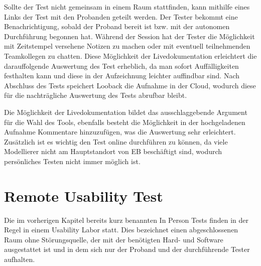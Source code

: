 Sollte der Test nicht gemeinsam in einem Raum stattfinden, kann mithilfe eines Links der Test mit den Probanden geteilt werden.
Der Tester bekommt eine Benachrichtigung, sobald der Proband bereit ist bzw. mit der autonomen Durchführung begonnen hat.
Während der Session hat der Tester die Möglichkeit mit Zeitstempel versehene Notizen zu machen oder mit eventuell teilnehmenden Teamkollegen zu chatten.
Diese Möglichkeit der Livedokumentation erleichtert die darauffolgende Auswertung des Test erheblich, da man sofort Auffälligkeiten festhalten kann und diese in der Aufzeichnung leichter auffindbar sind.
Nach Abschluss des Tests speichert Looback die Aufnahme in der Cloud, wodurch diese für die nachträgliche Auswertung des Tests abrufbar bleibt. \cite{.10.01.2020}

Die Möglichkeit der Livedokumentation bildet das ausschlaggebende Argument für die Wahl des Tools, ebenfalls besteht die Möglichkeit in der hochgeladenen Aufnahme Kommentare hinzuzufügen, was die Auswertung sehr erleichtert.
Zusätzlich ist es wichtig den Test online durchführen zu können, da viele Modellierer nicht am Hauptstandort von EB beschäftigt sind, wodurch persönliches Testen nicht immer möglich ist.

\section{Remote Usability Test}
Die im vorherigen Kapitel bereits kurz benannten \glqq In Person\grqq{} Tests finden in der Regel in einem Usability Labor statt.
Dies bezeichnet einen abgeschlossenen Raum ohne Störungsquelle, der mit der benötigten Hard- und Software ausgestattet ist und in dem sich nur der Proband und der durchführende Tester aufhalten.

